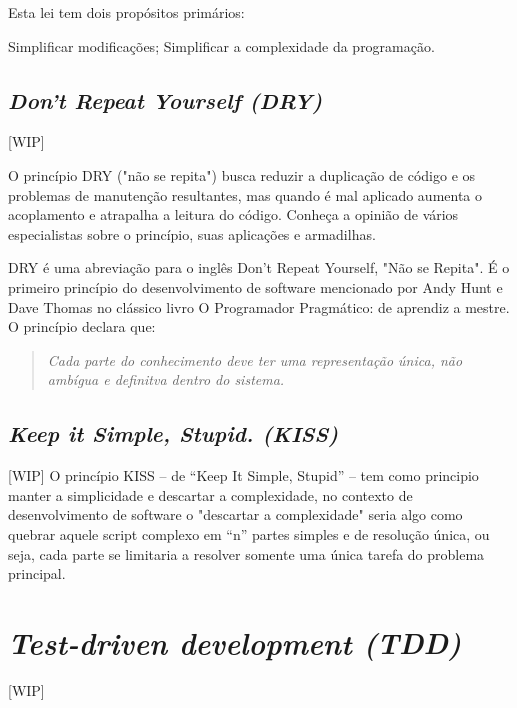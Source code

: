 \documentclass[12pt]{article}
\begin{document}
Esta lei tem dois propósitos primários:

    Simplificar modificações;
    Simplificar a complexidade da programação.


\subsection{\textit{Don't Repeat Yourself (DRY)}} \label{sec:dey}
[WIP]

O princípio DRY ("não se repita") busca reduzir a duplicação de código e os problemas de manutenção resultantes, mas quando é mal aplicado aumenta o acoplamento e atrapalha a leitura do código. Conheça a opinião de vários especialistas sobre o princípio, suas aplicações e armadilhas.

DRY é uma abreviação para o inglês Don't Repeat Yourself, "Não se Repita". É o primeiro princípio do desenvolvimento de software mencionado por Andy Hunt e Dave Thomas no clássico livro O Programador Pragmático: de aprendiz a mestre. O princípio declara que:

\begin{quote}
\textit{Cada parte do conhecimento deve ter uma representação única, não ambígua e definitva dentro do sistema.}
\end{quote}


\subsection{\textit{Keep it Simple, Stupid. (KISS)}} \label{sec:kiss}
[WIP]
O princípio KISS – de “Keep It Simple, Stupid” – tem como principio manter a simplicidade e descartar a complexidade, no contexto de desenvolvimento de software o "descartar a complexidade" seria algo como quebrar aquele script complexo em “n” partes simples e de resolução única, ou seja, cada parte se limitaria a resolver somente uma única tarefa do problema principal.


\section{\textsl{Test-driven development (TDD)}} \label{sec:tdd}
[WIP]
%
%  
%
\end{document}
